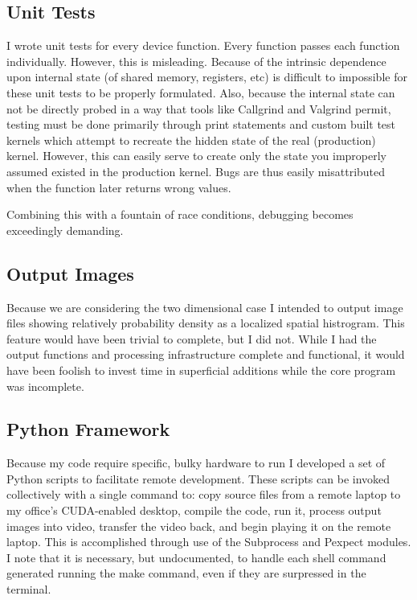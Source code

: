 \documentclass[11pt, conference, compsocconf]{IEEEtran}
\begin{document}
\subsection{Unit Tests}
I wrote unit tests for every device function. Every function passes each function individually. However, this is misleading. Because of the intrinsic dependence upon internal state (of shared memory, registers, etc) is difficult to impossible for these unit tests to be properly formulated. Also, because the internal state can not be directly probed in a way that tools like Callgrind and Valgrind permit, testing must be done primarily through print statements and custom built test kernels which attempt to recreate the hidden state of the real (production) kernel. However, this can easily serve to create only the state you improperly assumed existed in the production kernel. Bugs are thus easily misattributed when the function later returns wrong values.

Combining this with a fountain of race conditions, debugging becomes exceedingly demanding. 

\subsection{Output Images}
Because we are considering the two dimensional case I intended to output image files showing relatively probability density as a localized spatial histrogram. This feature would have been trivial to complete, but I did not. While I had the output functions and processing infrastructure complete and functional, it would have been foolish to invest time in superficial additions while the core program was incomplete.

\subsection{Python Framework}
Because my code require specific, bulky hardware to run I developed a set of Python scripts to facilitate remote development. These scripts can be invoked collectively with a single command to: copy source files from a remote laptop to my office's CUDA-enabled desktop, compile the code, run it, process output images into video, transfer the video back, and begin playing it on the remote laptop. This is accomplished through use of the Subprocess and Pexpect modules. I note that it is necessary, but undocumented, to handle each shell command generated running the make command, even if they are surpressed in the terminal.
\end{document}

